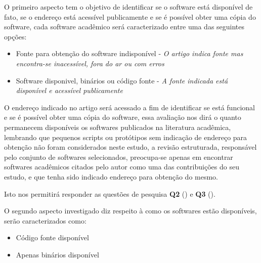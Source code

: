 O primeiro aspecto tem o objetivo de identificar se o software está disponível
de fato, se o endereço está acessível publicamente e se é possível obter uma
cópia do software, cada software acadêmico será caracterizado entre uma das
seguintes opções:

\begin{itemize}
  \item Fonte para obtenção do software indisponível -
    {\it O artigo indica fonte mas encontra-se inacessível, fora do ar ou com erros}
  \item Software disponivel, binários ou código fonte -
    {\it A fonte indicada está disponível e acessível publicamente}
\end{itemize}

O endereço indicado no artigo será acessado a fim de identificar se está
funcional e se é possível obter uma cópia do software, essa avaliação nos dirá
o quanto permanecem disponíveis os softwares publicados na literatura
acadêmica, lembrando que pequenos scripts ou protótipos sem indicação de
endereço para obtenção não foram considerados neste estudo, a revisão
estruturada, responsável pelo conjunto de softwares selecionados, preocupa-se
apenas em encontrar softwares acadêmicos citados pelo autor como uma das
contribuições do seu estudo, e que tenha sido indicado endereço para obtenção do
mesmo.

Isto nos permitirá responder as questões de pesquisa {\bf Q2} (\QuestaoDois)
e {\bf Q3} (\QuestaoTres).


O segundo aspecto investigado diz respeito à como os softwares estão disponíveis,
serão caracterizados como:

\begin{itemize}
  \item Código fonte disponível
  \item Apenas binários disponível
\end{itemize}

%
%

